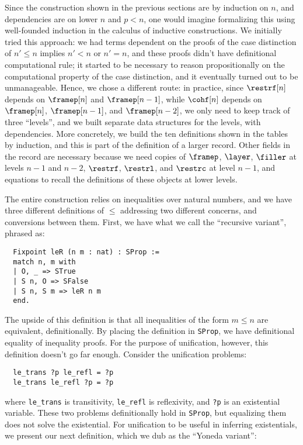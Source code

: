 \documentclass[10pt]{art.cls/art}
\begin{document}
Since the construction shown in the previous sections are by induction on $n$, and dependencies are on lower $n$ and $p < n$, one would imagine formalizing this using well-founded induction in the calculus of inductive constructions. We initially tried this approach: we had terms dependent on the proofs of the case distinction of $n' \leq n$ implies $n' < n$ or $n' = n$, and these proofs didn't have definitional computational rule; it started to be necessary to reason propositionally on the computational property of the case distinction, and it eventually turned out to be unmanageable. Hence, we chose a different route: in practice, since $\restrf[n]$ depends on $\framep[n]$ and $\framep[n-1]$, while $\cohf[n]$ depends on $\framep[n]$, $\framep[n-1]$, and $\framep[n-2]$, we only need to keep track of three ``levels'', and we built separate data structures for the levels, with dependencies. More concretely, we build the ten definitions shown in the tables by induction, and this is part of the definition of a larger record. Other fields in the record are necessary because we need copies of $\framep$, $\layer$, $\filler$ at levels $n - 1$ and $n - 2$, $\restrf$, $\restrl$, and $\restrc$ at level $n - 1$, and equations to recall the definitions of these objects at lower levels.

The entire construction relies on inequalities over natural numbers, and we have three different definitions of $\leq$ addressing two different concerns, and conversions between them. First, we have what we call the ``recursive variant'', phrased as:

\begin{verbatim}
  Fixpoint leR (n m : nat) : SProp :=
  match n, m with
  | O, _ => STrue
  | S n, O => SFalse
  | S n, S m => leR n m
  end.
\end{verbatim}

The upside of this definition is that all inequalities of the form $m \leq n$ are equivalent, definitionally. By placing the definition in \texttt{SProp}, we have definitional equality of inequality proofs. For the purpose of unification, however, this definition doesn't go far enough. Consider the unification problems:

\begin{verbatim}
  le_trans ?p le_refl = ?p
  le_trans le_refl ?p = ?p
\end{verbatim}

where \texttt{le\_trans} is transitivity, \texttt{le\_refl} is reflexivity, and \texttt{?p} is an existential variable. These two problems definitionally hold in \texttt{SProp}, but equalizing them does not solve the existential. For unification to be useful in inferring existentials, we present our next definition, which we dub as the ``Yoneda variant'':
\end{document}
